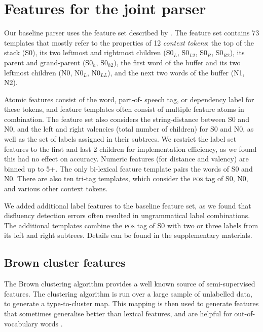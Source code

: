 \documentclass[11pt,letterpaper]{article}
\newcommand{\pos}{\textsc{pos}\xspace}
\newcommand{\szero}{S0\xspace}
\newcommand{\nzero}{N0\xspace}
\newcommand{\szeroH}{S0$_h$\xspace}
\newcommand{\szeroHH}{S0$_{h2}$\xspace}
\newcommand{\szeroL}{S0$_L$\xspace}
\newcommand{\szeroLL}{S0$_{L2}$\xspace}
\newcommand{\szeroR}{S0$_R$\xspace}
\newcommand{\szeroRR}{S0$_{R2}$\xspace}
\newcommand{\nzeroL}{N0$_L$\xspace}
\newcommand{\nzeroLL}{N0$_{LL}$\xspace}
\begin{document}
\section{Features for the joint parser}
\label{sec:features}

Our baseline parser uses the feature set described by \citet{zhang:11}.
The feature set contains 73 templates that mostly refer to the properties of
12 \emph{context tokens}: the top of the stack (\szero), its two leftmost and
rightmost children (\szeroL, \szeroLL, \szeroR, \szeroRR), its parent and
grand-parent (\szeroH, \szeroHH), the first word of the buffer and its two leftmost
children (\nzero, \nzeroL, \nzeroLL), and the next two words of the buffer (N1, N2).

Atomic features consist of the word, part-of- speech tag, or dependency label
for these tokens, and feature templates often consist of multiple feature atoms
in combination.  The feature set also considers the string-distance between \szero
and \nzero, and the left and right valencies
(total number of children) for \szero and \nzero, as well as the set of labels
assigned in their subtrees. We restrict the label set features to the first and
last 2 children for implementation efficiency, as we found this had no effect on
accuracy. Numeric features (for distance and valency) are binned up to 5+.
The only bi-lexical feature template pairs
the words of \szero and \nzero.
There are also ten tri-tag templates, which consider the
\pos tag of \szero, \nzero, and various other context tokens.

We added additional label features to the baseline feature
set, as we found that disfluency detection errors often resulted in ungrammatical
label combinations.  The additional templates combine the \pos tag of \szero with
two or three labels from its left and right subtrees.  Details can be found in
the supplementary materials.

\subsection{Brown cluster features}

The Brown clustering algorithm \citep{brown:92} provides a well known source
of semi-supervised features. The clustering algorithm is run over a large sample
of unlabelled data, to generate a type-to-cluster map. This mapping is then used
to generate features that sometimes generalise better than lexical features,
and are helpful for out-of-vocabulary words \citep{turian:10}.
\end{document}
